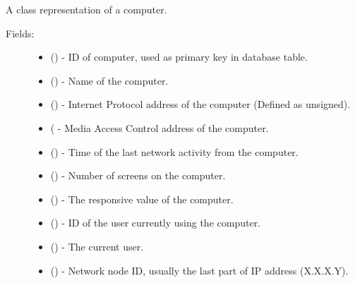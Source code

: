 \documentclass[letterpaper,10pt,english]{sphinxmanual}
\begin{document}
\begin{fulllineitems}
\label{models:models.Computer}
A class representation of a computer.
\begin{description}
\item[{Fields:}] \leavevmode\begin{itemize}
\item {} 
        ()        - ID of computer, used as primary key in database table.

\item {} 
        ()        - Name of the computer.

\item {} 
        ()        - Internet Protocol address of the computer (Defined as unsigned).

\item {} 
        (        - Media Access Control address of the computer.

\item {} 
        ()        - Time of the last network activity from the computer.

\item {} 
        ()        - Number of screens on the computer.

\item {} 
        ()        - The responsive value of the computer.

\item {} 
        ()        - ID of the user currently using the computer.

\item {} 
 ()        - The current user.

\item {} 
        ()        - Network node ID, usually the last part of IP address (X.X.X.Y).

\end{itemize}


\end{description}
\end{fulllineitems}
\end{document}
